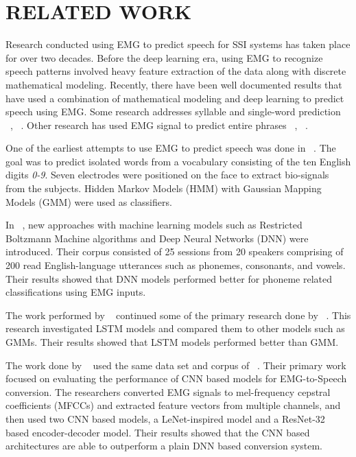 \documentclass{article}
\begin{document}
\section{RELATED WORK}
\label{sec:RELATED WORK}

Research conducted using EMG to predict speech for SSI systems has taken place for over two decades. Before the deep learning era, using EMG to recognize speech patterns involved heavy feature extraction of the data along with discrete mathematical modeling. Recently, there have been well documented results that have used a combination of mathematical modeling and deep learning to predict speech using EMG. Some research addresses syllable and single-word prediction ~\cite{lopez-larraz_syllable-based_2010}, ~\cite{maier-hein_session_2005}. Other research has used EMG signal to predict entire phrases ~\cite{janke_emg--speech:_2017}, ~\cite{kapur_alterego:_2018}.

One of the earliest attempts to use EMG to predict speech was done in ~\cite{maier-hein_session_2005}. The goal was to predict isolated words from a vocabulary consisting of the ten English digits \textit{0-9}. Seven electrodes were positioned on the face to extract bio-signals from the subjects. Hidden Markov Models (HMM) with Gaussian Mapping Models (GMM) were used as classifiers. 

In ~\cite{wand_pattern_2014}, new approaches with machine learning models such as Restricted Boltzmann Machine algorithms and Deep Neural Networks (DNN) were introduced. Their corpus consisted of 25 sessions from 20 speakers comprising of 200 read English-language utterances such as phonemes, consonants, and vowels. Their results showed that DNN models performed better for phoneme related classifications using EMG inputs. 

The work performed by ~\cite{janke_emg--speech:_2017} continued some of the primary research done by ~\cite{wand_pattern_2014}. This research investigated LSTM models and compared them to other models such as GMMs. Their results showed that LSTM models performed better than GMM.

The work done by ~\cite{diener_session-independent_nodate} used the same data set and corpus of ~\cite{janke_emg--speech:_2017}. Their primary work focused on evaluating the performance of CNN based models for EMG-to-Speech conversion. The researchers converted EMG signals to mel-frequency cepstral coefficients (MFCCs) and extracted feature vectors from multiple channels, and then used two CNN based models, a LeNet-inspired model and a ResNet-32 based encoder-decoder model. Their results showed that the CNN based architectures are able to outperform a plain DNN based conversion system.
\end{document}
